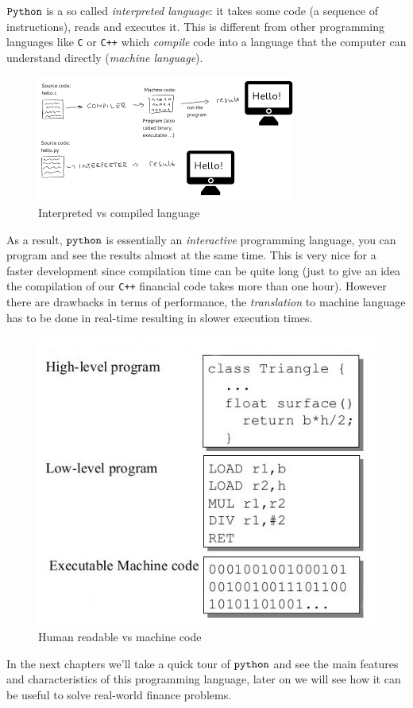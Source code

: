 $\tt{Python}$ is a so called \emph{interpreted language}: it takes some code (a sequence of instructions), reads and executes it. This is different from other programming languages like \texttt{C} or \texttt{C++} which \emph{compile} code into a language that the computer can understand directly (\emph{machine language}).

\begin{figure}[h]
\centering
\includegraphics[width=0.7\linewidth]{index.png}
\caption{Interpreted vs compiled language}
\end{figure}

As a result, \(\tt{python}\) is essentially an \emph{interactive} programming language, you can program and see the results almost at the same time. This is very nice for a faster development since compilation time can be quite long (just to give an idea the compilation of our \texttt{C++} financial code takes more than one hour).
However there are drawbacks in terms of performance, the \emph{translation} to machine language has to be done in real-time resulting in slower execution times.

\begin{figure}[h]
\centering
\includegraphics[width=0.5\linewidth]{machine_language.jpeg}
\caption{Human readable vs machine code}
\end{figure}

In the next chapters we'll take a quick tour of $\tt{python}$ and see the main features and characteristics of this programming language, later on we will see how it can be useful to solve real-world finance problems.

